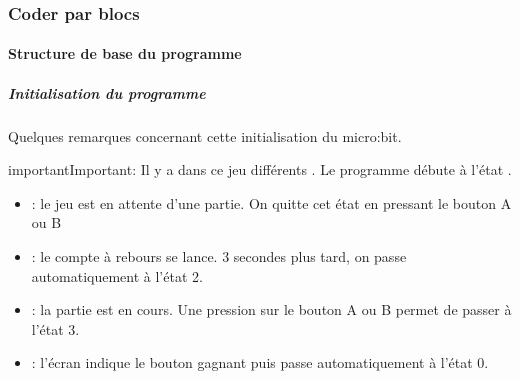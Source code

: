\documentclass[letterpaper,10pt,french]{sphinxmanual}
\begin{document}
\subsubsection{Coder par blocs}
\label{\detokenize{projets/goFast-bloc-coder:index-0}}\label{\detokenize{projets/goFast-bloc-coder:coder-par-blocs}}\label{\detokenize{projets/goFast-bloc-coder::doc}}

\paragraph{Structure de base du programme}
\label{\detokenize{projets/goFast-bloc-coder:structure-de-base-du-programme}}

\subparagraph{Initialisation du programme}
\label{\detokenize{projets/goFast-bloc-coder:initialisation-du-programme}}
\noindent{}

Quelques remarques concernant cette initialisation du micro:bit.

\begin{sphinxadmonition}{important}{Important:}
Il y a dans ce jeu différents .
Le programme débute à l’état .
\begin{itemize}
\item {} 
 : le jeu est en attente d’une partie.
On quitte cet état en pressant le bouton A ou B

\item {} 
 : le compte à rebours se lance.
3 secondes plus tard, on passe automatiquement à l’état 2.

\item {} 
 : la partie est en cours. Une pression sur le bouton
A ou B permet de passer à l’état 3.

\item {} 
 : l’écran indique le bouton gagnant puis passe
automatiquement à l’état 0.

\end{itemize}
\end{sphinxadmonition}
\end{document}
